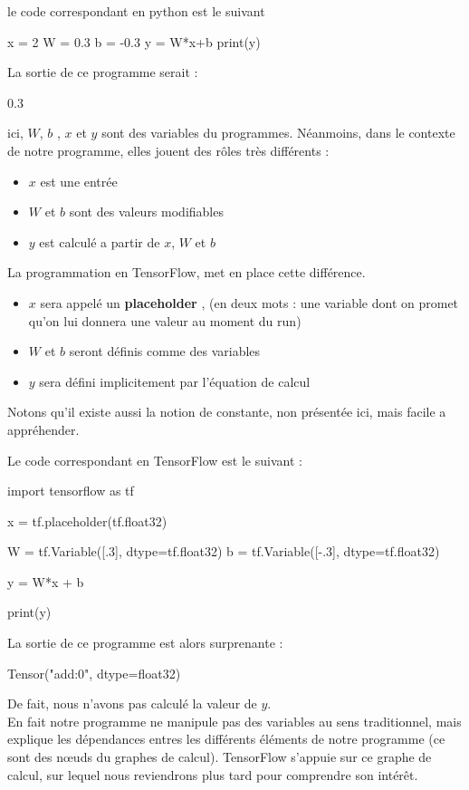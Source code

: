 \documentclass[a4paper,11pt]{book}
\theoremstyle{theo}
\begin{document}
le code correspondant en python est le suivant
\begin{mypython}
x = 2
W = 0.3
b = -0.3
y = W*x+b
print(y)
\end{mypython}

La sortie de ce programme serait :
\begin{myoutput}
0.3
\end{myoutput}

ici, $W$, $b$ , $x$ et $y$ sont des variables du programmes.
Néanmoins, dans le contexte de notre programme, elles jouent des rôles très différents :
\begin{itemize}
\item $x$ est une entrée 
\item $W$ et $b$ sont des valeurs modifiables
\item $y$ est calculé a partir de $x$, $W$ et $b$
\end{itemize}

La programmation en TensorFlow, met en place cette différence.
\begin{itemize}
\item $x$ sera appelé un \textbf{placeholder} , (en deux mots : une variable dont on promet qu'on lui donnera une valeur au moment du run)
\item $W$ et $b$ seront définis comme des variables
\item $y$ sera défini implicitement par l'équation de calcul 
\end{itemize}

Notons qu'il existe aussi la notion de constante, non présentée ici, mais facile a appréhender.

Le code correspondant en TensorFlow est le suivant :
\begin{mypython}
import tensorflow as tf

x = tf.placeholder(tf.float32)

W = tf.Variable([.3], dtype=tf.float32)
b = tf.Variable([-.3], dtype=tf.float32)

y = W*x + b

print(y)
\end{mypython}

La sortie de ce programme est alors surprenante :
\begin{myoutput}
Tensor("add:0", dtype=float32)
\end{myoutput}

De fait, nous n'avons pas calculé la valeur de $y$.\\
En fait notre programme ne manipule pas des variables au sens traditionnel, mais explique les dépendances entres les différents éléments de notre programme (ce sont des nœuds du graphes de calcul). TensorFlow s'appuie sur ce graphe de calcul, sur lequel nous reviendrons plus tard pour comprendre son intérêt.\\
\end{document}
